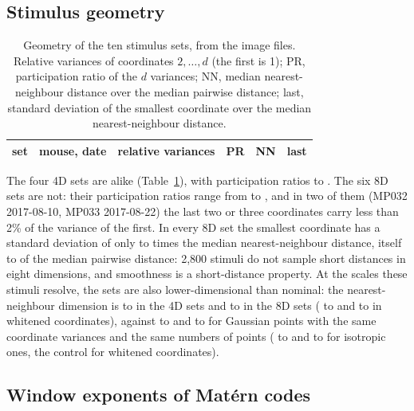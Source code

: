 \subsection{Stimulus geometry}\label{sec:geometry}

\begin{table}[t]
\centering\footnotesize
\caption{Geometry of the ten stimulus sets, from the image files. Relative variances of coordinates $2, \dots, d$ (the first is 1); PR, participation ratio of the $d$ variances; NN, median nearest-neighbour distance over the median pairwise distance; last, standard deviation of the smallest coordinate over the median nearest-neighbour distance.}\label{tab:geometry}
\begin{tabular}{llp{6.6cm}ccc}
\toprule
set & mouse, date & relative variances & PR & NN & last \\
\midrule

\end{tabular}
\end{table}

The four 4D sets are alike (Table~\ref{tab:geometry}), with participation ratios \PRFourMin{} to \PRFourMax{}. The six 8D sets are not: their participation ratios range from \PREightMin{} to \PREightMax{}, and in two of them (MP032 2017-08-10, MP033 2017-08-22) the last two or three coordinates carry less than 2\% of the variance of the first. In every 8D set the smallest coordinate has a standard deviation of only \SDNNEightMin{} to \SDNNEightMax{} times the median nearest-neighbour distance, itself \NNEightMin{} to \NNEightMax{} of the median pairwise distance: 2,800 stimuli do not sample short distances in eight dimensions, and smoothness is a short-distance property. At the scales these stimuli resolve, the sets are also lower-dimensional than nominal: the nearest-neighbour dimension is \DnnFourMin{} to \DnnFourMax{} in the 4D sets and \DnnEightMin{} to \DnnEightMax{} in the 8D sets (\DnnWhiteFourMin{} to \DnnWhiteFourMax{} and \DnnWhiteEightMin{} to \DnnWhiteEightMax{} in whitened coordinates), against \DnnGaussFourMin{} to \DnnGaussFourMax{} and \DnnGaussEightMin{} to \DnnGaussEightMax{} for Gaussian points with the same coordinate variances and the same numbers of points (\DnnGaussIsoFourMin{} to \DnnGaussIsoFourMax{} and \DnnGaussIsoEightMin{} to \DnnGaussIsoEightMax{} for isotropic ones, the control for whitened coordinates).

\subsection{Window exponents of Mat\'ern codes}

